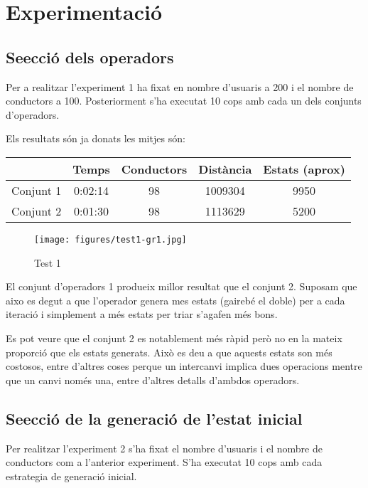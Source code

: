 \section{Experimentació}

\subsection{Se\lgem ecció dels operadors}
Per a realitzar l'experiment 1 ha fixat en nombre d'usuaris a 200 i el nombre de conductors a 100.
Posteriorment s'ha executat 10 cops amb cada un dels conjunts d'operadors.


Els resultats són ja donats les mitjes són:

\begin{center}
\begin{tabular}{l|cccc}
         & Temps & Conductors & Distància & Estats (aprox)\\
\hline
Conjunt 1 & 0:02:14 & 98 & 1009304 & 9950 \\
Conjunt 2 & 0:01:30 & 98 & 1113629 & 5200
\end{tabular}
\end{center}


\begin{figure}[H]
\begin{center}
 \texttt{[image: figures/test1-gr1.jpg]}
 \label{test1-gr1}
\caption{Test 1}
\end{center}
\end{figure}
                

El conjunt d'operadors 1 produeix millor resultat que el conjunt 2.
Suposam que aixo es degut a que l'operador genera mes estats (gairebé el doble) per a cada iteració i simplement a més estats per triar s'agafen més bons.

Es pot veure que el conjunt 2 es notablement més ràpid però no en la mateix proporció que els estats generats. Això es deu a que aquests estats
son més costosos, entre d'altres coses perque un intercanvi implica dues operacions mentre que un canvi només una, entre d'altres detalls d'ambdos operadors.


\subsection{Se\lgem ecció de la generació de l'estat inicial}
Per realitzar l'experiment 2 s'ha fixat el nombre d'usuaris i el nombre de conductors com a l'anterior experiment.                                                                                   
S'ha executat 10 cops amb cada estrategia de generació inicial.
                                                                                                                                                                                                     
